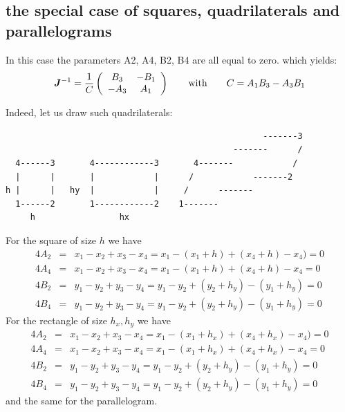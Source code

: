 \subsection{the special case of squares, quadrilaterals and parallelograms}

In this case the parameters A2, A4, B2, B4 are all equal to zero.
which yields:
\[
{\bm J}^{-1} = \frac{1}{C}
\left(
\begin{array}{cc}
B_3  & -B_1  \\
-A_3  & A_1 
\end{array}
\right)
\qquad 
{\rm with }
\qquad
C= A_1B_3-A_3  B_1 
\]

Indeed, let us draw such quadrilaterals:

\begin{verbatim}                
                                                    -------3
                                              -------      /
  4------3       4------------3       4-------            /
  |      |       |            |      /            -------2
h |      |   hy  |            |     /      ------- 
  1------2       1------------2    1-------
     h                 hx  
\end{verbatim}



For the square of size $h$ we have 
\begin{eqnarray}
4A_2 &=& x_1 -x_2 +x_3 -x_4 = x_1 -(x_1+h) +(x_4+h) -x_4) =0 \nonumber\\
4A_4 &=& x_1 -x_2 +x_3 -x_4 = x_1 -(x_1+h) +(x_4+h) -x_4  =0 \nonumber\\
4B_2 &=& y_1 -y_2 +y_3 -y_4 = y_1 -y_2 + (y_2+h_y) -(y_1+h_y) = 0 \nonumber\\
4B_4 &=& y_1 -y_2 +y_3 -y_4 = y_1 -y_2 + (y_2+h_y) -(y_1+h_y) = 0 \nonumber
\end{eqnarray}
For the rectangle of size $h_x,h_y$ we have 
\begin{eqnarray}
4A_2 &=& x_1 -x_2 +x_3 -x_4 = x_1 -(x_1+h_x) +(x_4+h_x) -x_4) =0 \nonumber\\
4A_4 &=& x_1 -x_2 +x_3 -x_4 = x_1 -(x_1+h_x) +(x_4+h_x) -x_4  =0 \nonumber\\
4B_2 &=& y_1 -y_2 +y_3 -y_4 = y_1 -y_2 + (y_2+h_y) -(y_1+h_y) = 0 \nonumber\\
4B_4 &=& y_1 -y_2 +y_3 -y_4 = y_1 -y_2 + (y_2+h_y) -(y_1+h_y) = 0 \nonumber
\end{eqnarray}
and the same for the parallelogram.

